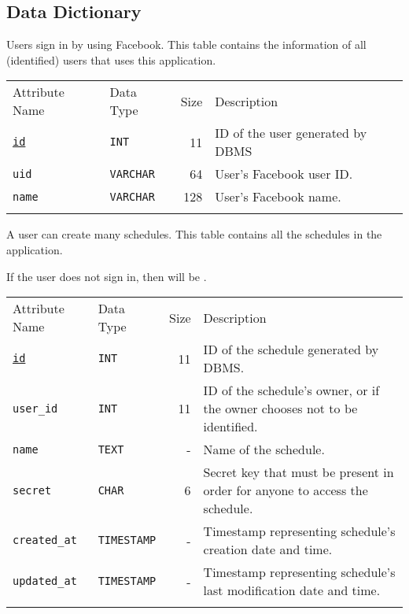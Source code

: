 
\subsection{Data Dictionary}

\newcommand{\TblData}[1]{\begin{center}
  \begin{tabular}{llrp{10cm}}
    \hline \NR
    Attribute Name & Data Type & Size & Description \\\NR
    \hline\NR
      #1
    \hline
  \end{tabular}
\end{center}}
\newcommand{\TblDataL}[1]{
  \begin{longtable}{llrp{10cm}}
    \hline \NR
    Attribute Name & Data Type & Size & Description \\\NR
    \hline\NR
      #1
    \hline
  \end{longtable}
}

\newcommand{\TblCol}[4]{
  \texttt{#1} & \texttt{#2} & #3 & #4 \\\NR
}




Users sign in by using Facebook.
This table contains the information
of all (identified) users that uses this application.

\TblData{
  \TblCol{\uline{id}}{INT}{11}{
    ID of the user generated by DBMS}
  \TblCol{uid}{VARCHAR}{64}{
    User's Facebook user ID.}
  \TblCol{name}{VARCHAR}{128}{
    User's Facebook name.}
}



A user can create many schedules.
This table contains all the schedules in the application.

If the user does not sign in,
then  will be .


\TblData{
  \TblCol{\uline{id}}{INT}{11}{
    ID of the schedule generated by DBMS.}
  \TblCol{user\_id}{INT}{11}{
    ID of the schedule's owner, or \Code{NULL}
    if the owner chooses not to be identified.}
  \TblCol{name}{TEXT}{-}{
    Name of the schedule.}
  \TblCol{secret}{CHAR}{6}{
    Secret key that must be present in order for anyone to access the schedule.}
  \TblCol{created\_at}{TIMESTAMP}{-}{
    Timestamp representing schedule's creation date and time.}
  \TblCol{updated\_at}{TIMESTAMP}{-}{
    Timestamp representing schedule's last modification date and time.}
}



